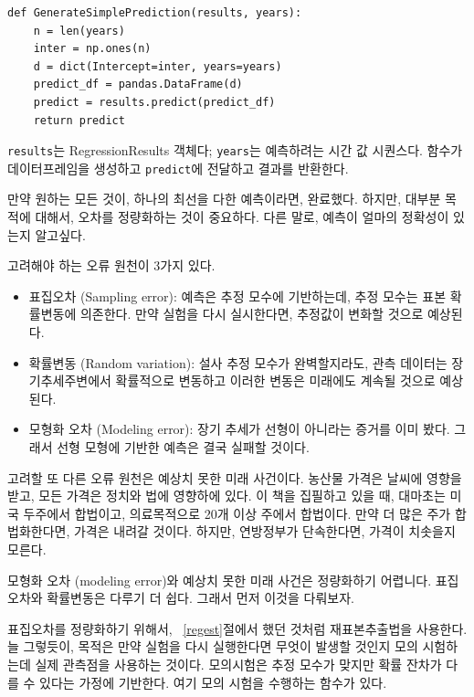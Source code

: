 \begin{verbatim}
def GenerateSimplePrediction(results, years):
    n = len(years)
    inter = np.ones(n)
    d = dict(Intercept=inter, years=years)
    predict_df = pandas.DataFrame(d)
    predict = results.predict(predict_df)
    return predict
\end{verbatim}

{\tt results}는 RegressionResults 객체다; 
{\tt years}는 예측하려는 시간 값 시퀀스다.
함수가 데이터프레임을 생성하고 {\tt predict}에 전달하고 결과를 반환한다.

만약 원하는 모든 것이, 하나의 최선을 다한 예측이라면, 완료했다.
하지만, 대부분 목적에 대해서, 오차를 정량화하는 것이 중요하다.
다른 말로, 예측이 얼마의 정확성이 있는지 알고싶다.

고려해야 하는 오류 원천이 3가지 있다.

\begin{itemize}

\item 표집오차 (Sampling error): 
예측은 추정 모수에 기반하는데, 추정 모수는 표본 확률변동에 의존한다.
만약 실험을 다시 실시한다면, 추정값이 변화할 것으로 예상된다.

\item 확률변동 (Random variation):
설사 추정 모수가 완벽할지라도, 관측 데이터는 장기추세주변에서 확률적으로 변동하고 이러한 변동은 미래에도 계속될 것으로 예상된다.

\item 모형화 오차 (Modeling error): 
장기 추세가 선형이 아니라는 증거를 이미 봤다. 그래서 선형 모형에 기반한 예측은 결국 실패할 것이다.

\end{itemize}

고려할 또 다른 오류 원천은 예상치 못한 미래 사건이다. 
농산물 가격은 날씨에 영향을 받고, 모든 가격은 정치와 법에 영향하에 있다. 이 책을 집필하고 있을 때, 대마초는 미국 두주에서 합법이고, 의료목적으로 20개 이상 주에서 합법이다. 만약 더 많은 주가 합법화한다면, 가격은 내려갈 것이다. 하지만, 연방정부가 단속한다면, 가격이 치솟을지 모른다.

모형화 오차 (modeling error)와 예상치 못한 미래 사건은 정량화하기 어렵니다. 표집오차와 확률변동은 다루기 더 쉽다. 그래서 먼저 이것을 다뤄보자.

표집오차를 정량화하기 위해서, ~\ref{regest}절에서 했던 것처럼 재표본추출법을 사용한다. 늘 그렇듯이, 목적은 만약 실험을 다시 실행한다면 무엇이 발생할 것인지 모의 시험하는데 실제 관측점을 사용하는 것이다.
모의시험은 추정 모수가 맞지만 확률 잔차가 다를 수 있다는 가정에 기반한다.
여기 모의 시험을 수행하는 함수가 있다.


